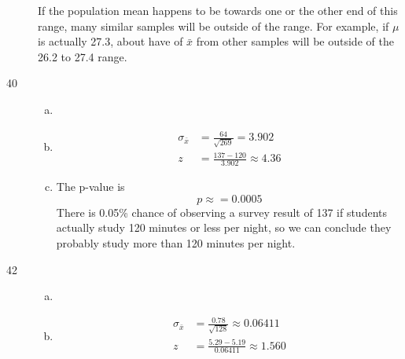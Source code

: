 \documentclass[letterpaper, landscape]{exam}
\begin{document}
\begin{description}
        If the population mean happens to be towards one or the other end of
        this range, many similar samples will be outside of the range. For
        example, if $\mu$ is actually 27.3, about have of $\bar{x}$ from other
        samples will be outside of the 26.2 to 27.4 range.

      \item[40]
        \begin{enumerate}[(a)]
          \item 
            \noindent

          \item
            \begin{align*}
              \sigma_{\bar{x}} &= \frac{64}{\sqrt{269}} = 3.902 \\
              z                &= \frac{137 - 120}{3.902} \approx \boxed{ 4.36 }
            \end{align*}

          \item The p-value is 
            \[
              p \approx = \boxed{ 0.0005 } 
            \]
            There is 0.05\% chance of observing a survey result of 137 if
            students actually study 120 minutes or less per night, so we can
            conclude they probably study more than 120 minutes per night.

        \end{enumerate}

      \newpage

      \item[42]
        \begin{enumerate}[(a)]
          \item 
            \noindent

          \item
            \begin{align*}
              \sigma_{\bar{x}} & = \frac{0.78}{\sqrt{128}}     \approx 0.06411 \\
              z                & = \frac{5.29 - 5.19}{0.06411} \approx \boxed{ 1.560 } \\
            \end{align*}


\end{enumerate}
\end{description}
\end{document}

